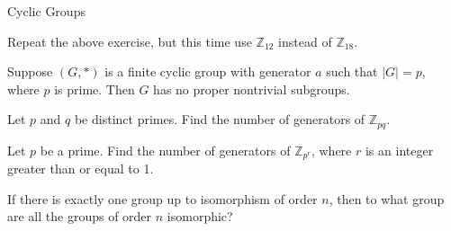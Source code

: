 \begin{section}{Cyclic Groups}
\begin{exercise}
Repeat the above exercise, but this time use $\mathbb{Z}_{12}$ instead of $\mathbb{Z}_{18}$.
\end{exercise}

\begin{corollary}
Suppose $(G,*)$ is a finite cyclic group with generator $a$ such that $|G|=p$, where $p$ is prime. Then $G$ has no proper nontrivial subgroups.
\end{corollary}

\begin{problem}
Let $p$ and $q$ be distinct primes. Find the number of generators of $\mathbb{Z}_{pq}$.
\end{problem}

\begin{problem}
Let $p$ be a prime. Find the number of generators of $\mathbb{Z}_{p^r}$, where $r$ is an integer greater than or equal to 1.
\end{problem}

\begin{problem}
If there is exactly one group up to isomorphism of order $n$, then to what group are all the groups of order $n$ isomorphic?
\end{problem}

\end{section}

